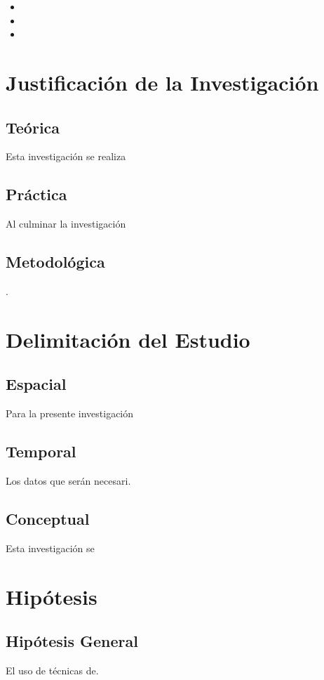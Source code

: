 \begin{itemize}
	\item {\Objone}
	\item {\Objtwo}
	\item {\Objthree}
\end{itemize}

\section{Justificación de la Investigación}

\subsection{Teórica}
Esta investigación se realiza 

\subsection{Práctica}
Al culminar la investigación 

\subsection{Metodológica}. 

\section{Delimitación del Estudio}

\subsection{Espacial}
Para la presente investigación 

\subsection{Temporal}
Los datos que serán necesari. 

\subsection{Conceptual}
Esta investigación se 

\section{Hipótesis}

\subsection{Hipótesis General}
\newcommand{\HipotesisGeneral}{
El uso de técnicas de.
}
\HipotesisGeneral
